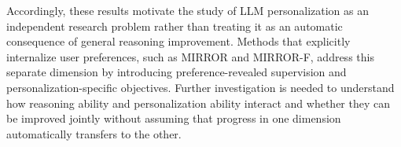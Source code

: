 \documentclass{article} %
\begin{document}
Accordingly, these results motivate the study of LLM personalization as an
independent research problem rather than treating it as an automatic
consequence of general reasoning improvement. Methods that explicitly
internalize user preferences, such as MIRROR and MIRROR-F, address this
separate dimension by introducing preference-revealed supervision and
personalization-specific objectives. Further investigation is needed to
understand how reasoning ability and personalization ability interact and
whether they can be improved jointly without assuming that progress in one
dimension automatically transfers to the other.
\end{document}
